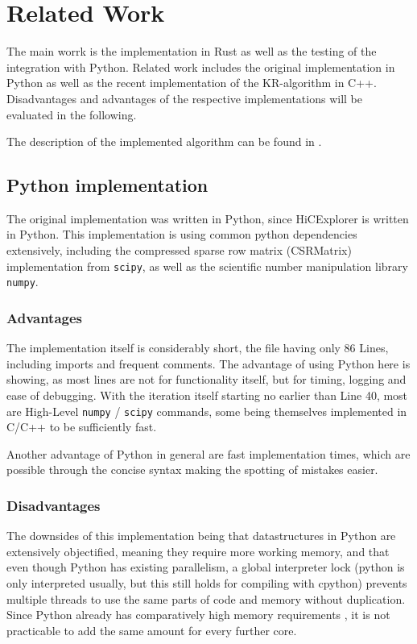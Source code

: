 \chapter{Related Work}\label{chap:relatedwork}

The main worrk is the implementation in Rust as well as the testing of the
integration with Python. Related work includes the original implementation in
Python as well as the recent implementation of the KR-algorithm in C++.
Disadvantages and advantages of the respective implementations will be
evaluated in the following.

The description of the implemented algorithm can be found in .


\section{Python implementation}\label{sec:python}

The original implementation was written in Python, since HiCExplorer is
written in Python. This implementation is using common python dependencies
extensively, including the compressed sparse row matrix (CSRMatrix)
implementation from \verb|scipy|, as well as the scientific number manipulation
library \verb|numpy|.

\subsection{Advantages}

The implementation itself is considerably short, the file having only 86 Lines,
including imports and frequent comments. The advantage of using Python here is
showing, as most lines are not for functionality itself, but for timing,
logging and ease of debugging. With the iteration itself starting no earlier
than Line 40, most are High-Level \verb|numpy| / \verb|scipy| commands, some
being themselves implemented in C/C++ to be sufficiently fast.

Another advantage of Python in general are fast implementation times, which are
possible through the concise syntax making the spotting of mistakes easier.

\subsection{Disadvantages}

The downsides of this implementation being that datastructures in Python are
extensively objectified, meaning they require more working memory, and that
even though Python has existing parallelism, a global interpreter lock (python
is only interpreted usually, but this still holds for compiling with cpython)
prevents multiple threads to use the same parts of code and memory without
duplication. Since Python already has comparatively high memory requirements
, it is not practicable to add the same amount
for every further core.

